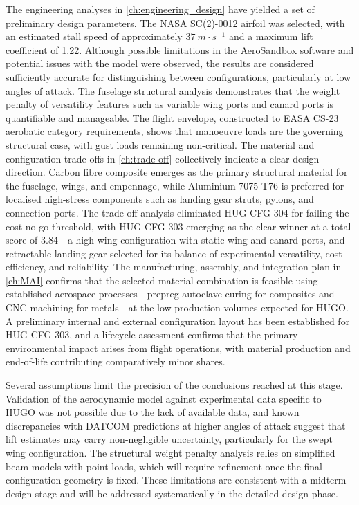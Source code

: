 The engineering analyses in \autoref{ch:engineering_design} have yielded a set of preliminary design parameters. The NASA SC(2)-0012 airfoil was selected, with an estimated stall speed of approximately $37 \ m \cdot s^{-1}$ and a maximum lift coefficient of 1.22. Although possible limitations in the AeroSandbox software and potential issues with the model were observed, the results are considered sufficiently accurate for distinguishing between configurations, particularly at low angles of attack. The fuselage structural analysis demonstrates that the weight penalty of versatility features such as variable wing ports and canard ports is quantifiable and manageable. The flight envelope, constructed to EASA CS-23 aerobatic category requirements, shows that manoeuvre loads are the governing structural case, with gust loads remaining non-critical. The material and configuration trade-offs in \autoref{ch:trade-off} collectively indicate a clear design direction. Carbon fibre composite emerges as the primary structural material for the fuselage, wings, and empennage, while Aluminium 7075-T76 is preferred for localised high-stress components such as landing gear struts, pylons, and connection ports. The trade-off analysis eliminated HUG-CFG-304 for failing the cost no-go threshold, with HUG-CFG-303 emerging as the clear winner at a total score of 3.84 - a high-wing configuration with static wing and canard ports, and retractable landing gear selected for its balance of experimental versatility, cost efficiency, and reliability. The manufacturing, assembly, and integration plan in \autoref{ch:MAI} confirms that the selected material combination is feasible using established aerospace processes - prepreg autoclave curing for composites and CNC machining for metals - at the low production volumes expected for HUGO. A preliminary internal and external configuration layout has been established for HUG-CFG-303, and a lifecycle assessment confirms that the primary environmental impact arises from flight operations, with material production and end-of-life contributing comparatively minor shares.

Several assumptions limit the precision of the conclusions reached at this stage. Validation of the aerodynamic model against experimental data specific to HUGO was not possible due to the lack of available data, and known discrepancies with DATCOM predictions at higher angles of attack suggest that lift estimates may carry non-negligible uncertainty, particularly for the swept wing configuration. The structural weight penalty analysis relies on simplified beam models with point loads, which will require refinement once the final configuration geometry is fixed. These limitations are consistent with a midterm design stage and will be addressed systematically in the detailed design phase.

